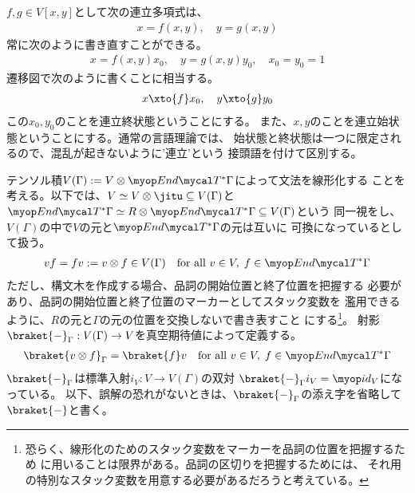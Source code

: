 {	$f,g\in V[x,y]$として次の連立多項式は、
	\begin{equation*}\begin{split}
		x = f(x,y),\quad y = g(x,y)
	\end{split}\end{equation*}
	常に次のように書き直すことができる。
	\begin{equation*}\begin{split}
		x = f(x,y)x_0,\quad y = g(x,y)y_0,\quad x_0 = y_0 = 1
	\end{split}\end{equation*}
	遷移図で次のように書くことに相当する。
	\begin{equation*}\begin{split}
		x\xto{f}x_0,\quad y\xto{g}y_0
	\end{split}\end{equation*}
	この$x_0,y_0$のことを連立終状態ということにする。
	また、$x,y$のことを連立始状態ということにする。通常の言語理論では、
	始状態と終状態は一つに限定されるので、混乱が起きないように'連立'という
	接頭語を付けて区別する。

	テンソル積$V(\Gamma):=V\otimes\End\T^*\Gamma$によって文法を線形化する
	ことを考える。以下では、$V\simeq V\otimes\jitu\subseteq V(\Gamma)$と
	$\End\T^*\Gamma\simeq R\otimes\End\T^*\Gamma\subseteq V(\Gamma)$という
	同一視をし、$V(\Gamma)$の中で$V$の元と$\End\T^*\Gamma$の元は互いに
	可換になっているとして扱う。
	\begin{equation*}\begin{split}
		vf = fv := v\otimes f\in V(\Gamma)
		\quad\text{for all } v\in V,\; f\in\End\T^*\Gamma
	\end{split}\end{equation*}
	ただし、構文木を作成する場合、品詞の開始位置と終了位置を把握する
	必要があり、品詞の開始位置と終了位置のマーカーとしてスタック変数を
	濫用できるように、$R$の元と$\Gamma$の元の位置を交換しないで書き表すこと
	にする\footnote{
		恐らく、線形化のためのスタック変数をマーカーを品詞の位置を把握するため
		に用いることは限界がある。品詞の区切りを把握するためには、
		それ用の特別なスタック変数を用意する必要があるだろうと考えている。
	}。
	射影$\braket{-}_\Gamma:V(\Gamma)\to V$を真空期待値によって定義する。
	\begin{equation*}\begin{split}
		\braket{v\otimes f}_\Gamma = \braket{f}v
		\quad\text{for all } v\in V,\; f\in\End\T^*\Gamma
	\end{split}\end{equation*}
	$\braket{-}_\Gamma$は標準入射$i_V:V\to V(\Gamma)$の双対
	$\braket{-}_\Gamma i_V=\id_V$になっている。
	以下、誤解の恐れがないときは、$\braket{-}_\Gamma$の添え字を省略して
	$\braket{-}$と書く。

}
